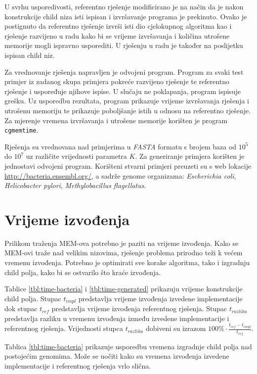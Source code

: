 \documentclass[times, utf8, seminar, numeric]{fer}
\begin{document}
U svrhu usporedivosti, referentno rješenje modificirano je na način da je nakon konstrukcije child niza isti ispisan i izvršavanje programa je prekinuto. Ovako je postignuto da referentno rješenje izvrši isti dio cjelokupnog algoritma kao i rješenje razvijeno u radu kako bi se vrijeme izvršavanja i količina utrošene memorije mogli ispravno usporediti. U rješenju u radu je također na poslijetku ispisan child niz. 

Za vrednovanje rješenja napravljen je odvojeni program. Program za svaki test primjer iz zadanog skupa primjera pokreće razvijeno rješenje te referentno rješenje i uspoređuje njihove ispise. U slučaju ne poklapanja, program ispisuje grešku. Uz usporedbu rezultata, program prikazuje vrijeme izvršavanja rješenja i utrošenu memoriju te prikazuje poboljšanje istih u odnosu na referentno rješenje. Za mjerenje vremena izvršavanja i utrošene memorije korišten je program \texttt{cgmemtime}.

Rješenja su vrednovana nad primjerima u \textit{FASTA} formatu s brojem baza od $10^5$ do $10^7$ uz različite vrijednosti parametra $K$. Za generiranje primjera korišten je jednostavi odvojeni program. Korišteni stvarni primjeri preuzeti su s web lokacije \url{http://bacteria.ensembl.org/}, a sadrže genome organizama: \textit{Escherichia coli}, \textit{Helicobacter pylori}, \textit{Methylobacillus flagellatus}.

\section{Vrijeme izvođenja}
\label{sec:time}

Prilikom traženja MEM-ova potrebno je paziti na vrijeme izvođenja. Kako se MEM-ovi traže nad velikim nizovima, rješenje problema prirodno teži k većem vremenu izvođenja. Potrebno je optimirati sve korake algoritma, tako i izgradnju child polja, kako bi se ostvarilo što kraće izvođenja. 

Tablice \ref{tbl:time-bacteria} i \ref{tbl:time-generated} prikazuju vrijeme konstrukcije child polja. Stupac $t_{impl}$  predstavlja vrijeme izvođenja izvedene implementacije dok stupac $t_{ref}$ predstavlja vrijeme izvođenja referentnog rješenja. Stupac $t_{razlika}$ predstavlja razliku u vremenu izvođenja između izvedene implementacije i referentnog rješenja. Vrijednosti stupca $t_{razlika}$ dobiveni su izrazom $100\% \cdot \frac{t_{ref} - t_{impl}}{t_{ref}}$.

Tablica \ref{tbl:time-bacteria} prikazuje usporedbu vremena izgradnje child polja nad postojećim genomima. Može se uočiti kako su vremena izvođenja izvedene implementacije i referentnog rješenja vrlo slična. 
\end{document}

